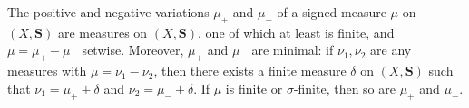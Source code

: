 The positive and negative variations $\mu_+$ and $\mu_-$ of a signed measure $\mu$ on $(X, \mathbf{S})$ are measures on $(X, \mathbf{S})$, one of which at least is finite, and $\mu = \mu_+ - \mu_-$ setwise. Moreover, $\mu_+$ and $\mu_-$ are minimal: if $\nu_1, \nu_2$ are any measures with $\mu = \nu_1 - \nu_2$, then there exists a finite measure $\delta$ on $(X, \mathbf{S})$ such that $\nu_1 = \mu_+ + \delta$ and $\nu_2 = \mu_- + \delta$. If $\mu$ is finite or $\sigma$-finite, then so are $\mu_+$ and $\mu_-$.
